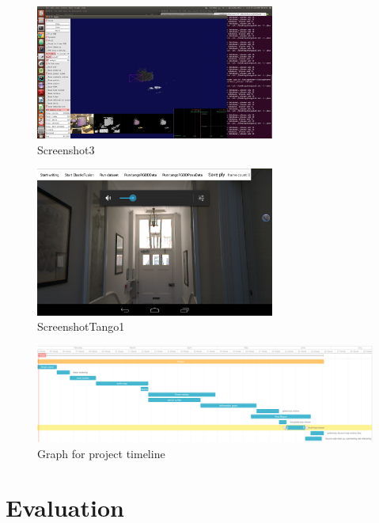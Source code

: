 \documentclass[12pt,twoside]{article}
\begin{document}
\begin{figure}[h]
    \centering
    \includegraphics[width=0.7\textwidth]{figures/Screenshot3}
    \caption{Screenshot3}
    \label{fig:Screenshot3}
\end{figure}

\begin{figure}[h]
    \centering
    \includegraphics[width=0.7\textwidth]{figures/ScreenshotTango1}
    \caption{ScreenshotTango1}
    \label{fig:ScreenshotTango1}
\end{figure}


\newpage

\begin{figure}
\centering
    \includegraphics[angle=90,width=\textwidth,height=\textheight,keepaspectratio]{figures/timeline2}
   \caption{Graph for project timeline}
    \label{fig:tiemline2}
\end{figure}

\newpage

\section{Evaluation}
\end{document}
